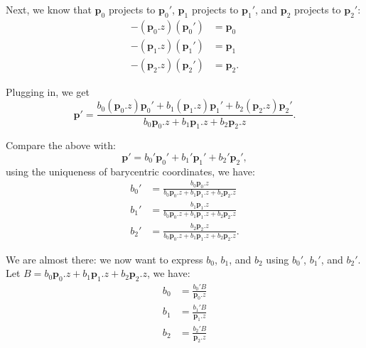 Next, we know that $\mathbf{p}_0$ projects to $\mathbf{p}_0'$, $\mathbf{p}_1$ projects to $\mathbf{p}_1'$, and $\mathbf{p}_2$ projects to $\mathbf{p}_2'$:
\begin{equation}
\begin{aligned}
-\left(\mathbf{p}_0.z\right) \left(\mathbf{p}_0'\right) &= \mathbf{p}_0 \\
-\left(\mathbf{p}_1.z\right) \left(\mathbf{p}_1'\right) &= \mathbf{p}_1 \\
-\left(\mathbf{p}_2.z\right) \left(\mathbf{p}_2'\right) &= \mathbf{p}_2.
\end{aligned}
\end{equation}

Plugging in, we get
\begin{equation}
\mathbf{p}' = \frac{b_0 \left(\mathbf{p}_0.z\right) \mathbf{p}_0' + b_1 \left(\mathbf{p}_1.z\right) \mathbf{p}_1' + b_2 \left(\mathbf{p}_2.z\right) \mathbf{p}_2'}{b_0 \mathbf{p}_0.z + b_1 \mathbf{p}_1.z + b_2 \mathbf{p}_2.z}.
\end{equation}

Compare the above with:
\begin{equation}
\mathbf{p}' = b_0' \mathbf{p}_0' + b_1' \mathbf{p}_1' + b_2' \mathbf{p}_2',
\end{equation}
using the uniqueness of barycentric coordinates, we have:
\begin{equation}
\begin{aligned}
b_0' &= \frac{b_0 \mathbf{p}_0.z}{b_0 \mathbf{p}_0.z + b_1 \mathbf{p}_1.z + b_2 \mathbf{p}_2.z} \\
b_1' &= \frac{b_1 \mathbf{p}_1.z}{b_0 \mathbf{p}_0.z + b_1 \mathbf{p}_1.z + b_2 \mathbf{p}_2.z} \\
b_2' &= \frac{b_2 \mathbf{p}_2.z}{b_0 \mathbf{p}_0.z + b_1 \mathbf{p}_1.z + b_2 \mathbf{p}_2.z}.
\end{aligned}
\label{eq:projected_barycentric}
\end{equation}

We are almost there: we now want to express $b_0$, $b_1$, and $b_2$ using $b_0'$, $b_1'$, and $b_2'$. Let $B = b_0 \mathbf{p}_0.z + b_1 \mathbf{p}_1.z + b_2 \mathbf{p}_2.z$, we have:
\begin{equation}
\begin{aligned}
b_0 &= \frac{b_0' B}{\mathbf{p}_0.z} \\
b_1 &= \frac{b_1' B}{\mathbf{p}_1.z} \\
b_2 &= \frac{b_2' B}{\mathbf{p}_2.z}
\end{aligned}
\end{equation}

